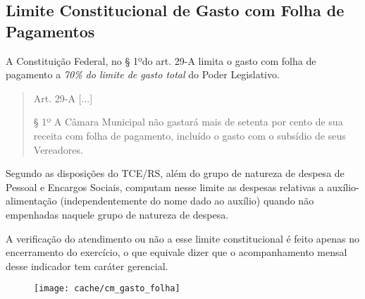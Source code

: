 
\subsection[Gastos com Folha de Pagamentos]{Limite Constitucional de Gasto com Folha de Pagamentos}

A Constituição Federal, no § 1ºdo art. 29-A limita o gasto com folha de pagamento a \textit{70\% do limite de gasto total} do Poder Legislativo.

\begin{quotation}
Art. 29-A [...]
 
§ 1º A Câmara Municipal não gastará mais de setenta por cento de sua receita com folha de pagamento, incluído o gasto com o subsídio de seus Vereadores.
\end{quotation}

Segundo as disposições do TCE/RS, além do grupo de natureza de despesa de Pessoal e Encargos Sociais, computam nesse limite as despesas relativas a auxílio-alimentação (independentemente do nome dado ao auxílio) quando não empenhadas naquele grupo de natureza de despesa.



A verificação do atendimento ou não a esse limite constitucional é feito apenas no encerramento do exercício, o que equivale dizer que o acompanhamento mensal desse indicador tem caráter gerencial.

\begin{figure}
\center
\texttt{[image: cache/cm\_gasto\_folha]}
\end{figure}

